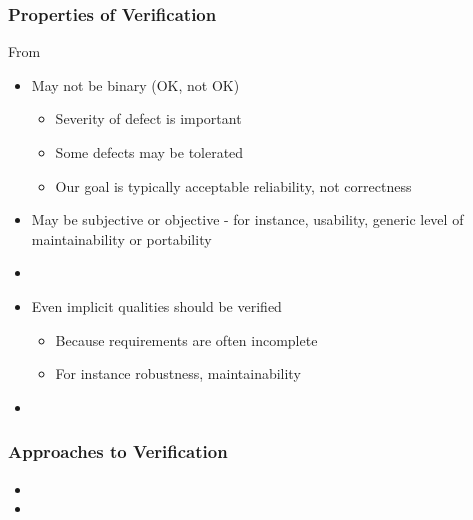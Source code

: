 \documentclass[t,12pt,numbers,fleqn]{beamer}
\begin{document}

\begin{frame}
\frametitle{Properties of Verification}

From \cite{GhezziEtAl2003}

\begin{itemize}

\item May not be binary (OK, not OK)
\begin{itemize}
\item Severity of defect is important
\item Some defects may be tolerated
\item Our goal is typically acceptable reliability, not correctness
\end{itemize}
\item May be subjective or objective - for instance, usability, generic level of
  maintainability or portability
\bi
\item {}
\ei
\item Even implicit qualities should be verified
\begin{itemize}
\item Because requirements are often incomplete
\item For instance robustness, maintainability
\end{itemize}
\item {} %
\end{itemize}

\end{frame}


\begin{frame}
\frametitle{Approaches to Verification}

\begin{itemize}

\item {}
\item {}

\end{itemize}

\end{frame}

\end{document}
